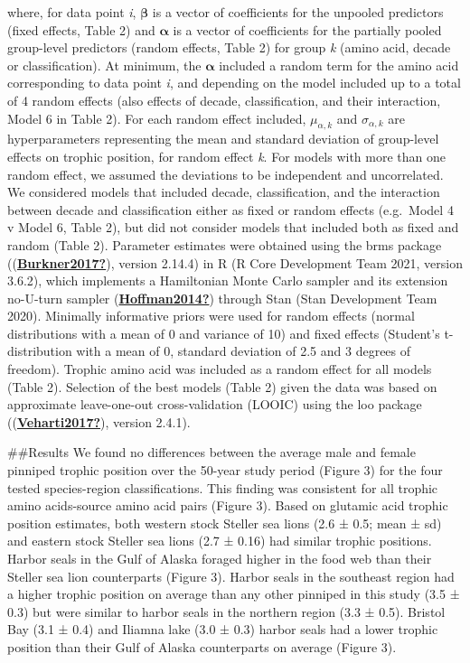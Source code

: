 \documentclass [11pt, proquest] {uwthesis}[2015/03/03]
\begin{document}
where, for data point \emph{i}, \(\boldsymbol\beta\) is a vector of coefficients for the unpooled predictors (fixed effects, Table 2) and \(\boldsymbol\alpha\) is a vector of coefficients for the partially pooled group-level predictors (random effects, Table 2) for group \emph{k} (amino acid, decade or classification). At minimum, the \(\boldsymbol\alpha\) included a random term for the amino acid corresponding to data point \emph{i}, and depending on the model included up to a total of 4 random effects (also effects of decade, classification, and their interaction, Model 6 in Table 2). For each random effect included, \(\mu_{α,k}\) and \(\sigma_{α,k}\) are hyperparameters representing the mean and standard deviation of group-level effects on trophic position, for random effect \emph{k}. For models with more than one random effect, we assumed the deviations to be independent and uncorrelated. We considered models that included decade, classification, and the interaction between decade and classification either as fixed or random effects (e.g.~Model 4 v Model 6, Table 2), but did not consider models that included both as fixed and random (Table 2). Parameter estimates were obtained using the brms package ((\protect\hyperlink{ref-Burkner2017}{\textbf{Burkner2017?}}), version 2.14.4) in R (R Core Development Team 2021, version 3.6.2), which implements a Hamiltonian Monte Carlo sampler and its extension no-U-turn sampler (\protect\hyperlink{ref-Hoffman2014}{\textbf{Hoffman2014?}}) through Stan (Stan Development Team 2020). Minimally informative priors were used for random effects (normal distributions with a mean of 0 and variance of 10) and fixed effects (Student's t-distribution with a mean of 0, standard deviation of 2.5 and 3 degrees of freedom). Trophic amino acid was included as a random effect for all models (Table 2). Selection of the best models (Table 2) given the data was based on approximate leave-one-out cross-validation (LOOIC) using the loo package ((\protect\hyperlink{ref-Veharti2017}{\textbf{Veharti2017?}}), version 2.4.1).

\#\#Results
We found no differences between the average male and female pinniped trophic position over the 50-year study period (Figure 3) for the four tested species-region classifications. This finding was consistent for all trophic amino acids-source amino acid pairs (Figure 3). Based on glutamic acid trophic position estimates, both western stock Steller sea lions (2.6 ± 0.5; mean ± sd) and eastern stock Steller sea lions (2.7 ± 0.16) had similar trophic positions. Harbor seals in the Gulf of Alaska foraged higher in the food web than their Steller sea lion counterparts (Figure 3). Harbor seals in the southeast region had a higher trophic position on average than any other pinniped in this study (3.5 ± 0.3) but were similar to harbor seals in the northern region (3.3 ± 0.5). Bristol Bay (3.1 ± 0.4) and Iliamna lake (3.0 ± 0.3) harbor seals had a lower trophic position than their Gulf of Alaska counterparts on average (Figure 3).
\end{document}
